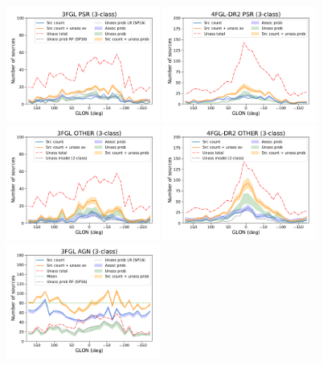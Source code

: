 \documentclass[referee]{aa} %
\begin{document}
\begin{figure}[h]
\centering
\includegraphics[width=0.45\textwidth]{plots/lon_profile_PSR_3FGL_3classes.pdf}
\includegraphics[width=0.45\textwidth]{plots/lon_profile_PSR_4FGL-DR2_3classes.pdf} \\
\includegraphics[width=0.45\textwidth]{plots/lon_profile_OTHER_3FGL_3classes.pdf}
\includegraphics[width=0.45\textwidth]{plots/lon_profile_OTHER_4FGL-DR2_3classes.pdf} \\
\includegraphics[width=0.45\textwidth]{plots/lon_profile_AGN_3FGL_3classes.pdf}

\end{figure}
\end{document}

